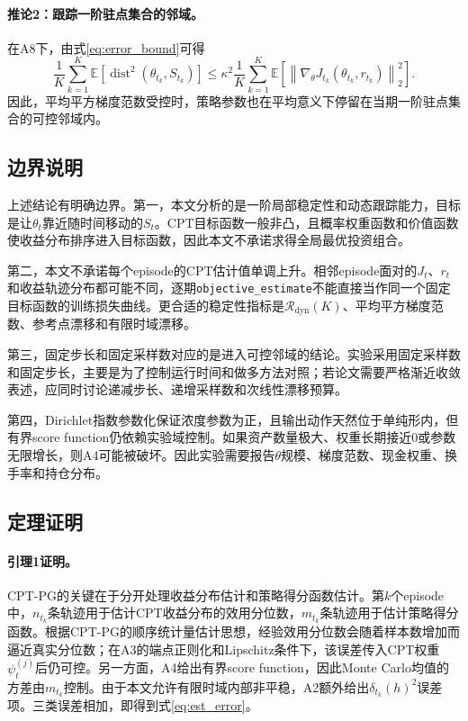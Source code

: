 \paragraph{推论2：跟踪一阶驻点集合的邻域。}
在A8下，由式\eqref{eq:error_bound}可得
\begin{equation}
\label{eq:distance_bound}
\frac{1}{K}
\sum_{k=1}^{K}
\mathbb{E}
\left[
\operatorname{dist}^2(\theta_{t_k},S_{t_k})
\right]
\le
\kappa^2
\frac{1}{K}
\sum_{k=1}^{K}
\mathbb{E}
\left[
\left\|
\nabla_\theta J_{t_k}(\theta_{t_k},r_{t_k})
\right\|_2^2
\right].
\end{equation}
因此，平均平方梯度范数受控时，策略参数也在平均意义下停留在当期一阶驻点集合的可控邻域内。

\subsection{边界说明}

上述结论有明确边界。第一，本文分析的是一阶局部稳定性和动态跟踪能力，目标是让$\theta_t$靠近随时间移动的$S_t$。CPT目标函数一般非凸，且概率权重函数和价值函数使收益分布排序进入目标函数，因此本文不承诺求得全局最优投资组合。

第二，本文不承诺每个episode的CPT估计值单调上升。相邻episode面对的$J_t$、$r_t$和收益轨迹分布都可能不同，逐期\texttt{objective\_estimate}不能直接当作同一个固定目标函数的训练损失曲线。更合适的稳定性指标是$\mathcal{R}_{\mathrm{dyn}}(K)$、平均平方梯度范数、参考点漂移和有限时域漂移。

第三，固定步长和固定采样数对应的是进入可控邻域的结论。实验采用固定采样数和固定步长，主要是为了控制运行时间和做多方法对照；若论文需要严格渐近收敛表述，应同时讨论递减步长、递增采样数和次线性漂移预算。

第四，Dirichlet指数参数化保证浓度参数为正，且输出动作天然位于单纯形内，但有界score function仍依赖实验域控制。如果资产数量极大、权重长期接近0或参数无限增长，则A4可能被破坏。因此实验需要报告$\theta$规模、梯度范数、现金权重、换手率和持仓分布。

\subsection{定理证明}

\paragraph{引理1证明。}
CPT-PG的关键在于分开处理收益分布估计和策略得分函数估计。第$k$个episode中，$n_{t_k}$条轨迹用于估计CPT收益分布的效用分位数，$m_{t_k}$条轨迹用于估计策略得分函数。根据CPT-PG的顺序统计量估计思想，经验效用分位数会随着样本数增加而逼近真实分位数；在A3的端点正则化和Lipschitz条件下，该误差传入CPT权重$\psi_t^{(j)}$后仍可控。另一方面，A4给出有界score function，因此Monte Carlo均值的方差由$m_{t_k}$控制。由于本文允许有限时域内部非平稳，A2额外给出$\delta_{t_k}(h)^2$误差项。三类误差相加，即得到式\eqref{eq:est_error}。

